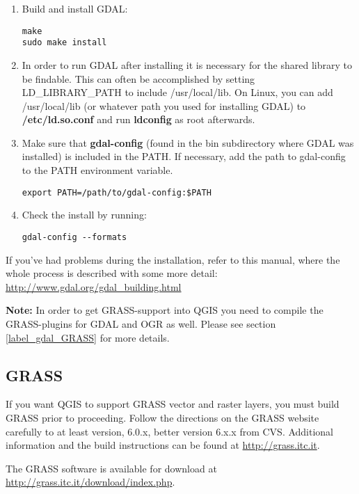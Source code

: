 \begin{enumerate}
\item Build and install GDAL:
\begin{verbatim}
make
sudo make install
\end{verbatim}

\item In order to run GDAL after installing it is necessary for the
shared library to be findable. This can often be accomplished by setting
LD\_LIBRARY\_PATH to include /usr/local/lib. On Linux, you can add
/usr/local/lib (or whatever path you used for installing GDAL) to
\textbf{/etc/ld.so.conf} and run \textbf{ldconfig} as root afterwards.

\item Make sure that \textbf{gdal-config} (found in the bin subdirectory where
GDAL was installed) is included in the PATH. If necessary, add the path to
gdal-config to the PATH environment variable.
  
\begin{verbatim}
export PATH=/path/to/gdal-config:$PATH
\end{verbatim}

\item Check the install by running:
\begin{verbatim}
gdal-config --formats
\end{verbatim}

\end{enumerate}

If you've had problems during the installation, refer to this manual,
where the whole process is described with some more detail:
\url{http://www.gdal.org/gdal\_building.html} 

\textbf{Note:} In order to get GRASS-support into QGIS you need to compile the GRASS-plugins
for GDAL and OGR as well. Please see section \ref{label_gdal_GRASS} for more details.

%
%
\subsection{GRASS}\label{label_grass}

If you want QGIS to support GRASS vector and raster layers, you must build
GRASS prior to proceeding. Follow the directions on the GRASS website
carefully to at least version, 6.0.x, better version 6.x.x from CVS.
Additional information and the build
instructions can be found at \url{http://grass.itc.it}.
 
The GRASS software is available for download at
\url{http://grass.itc.it/download/index.php}.

